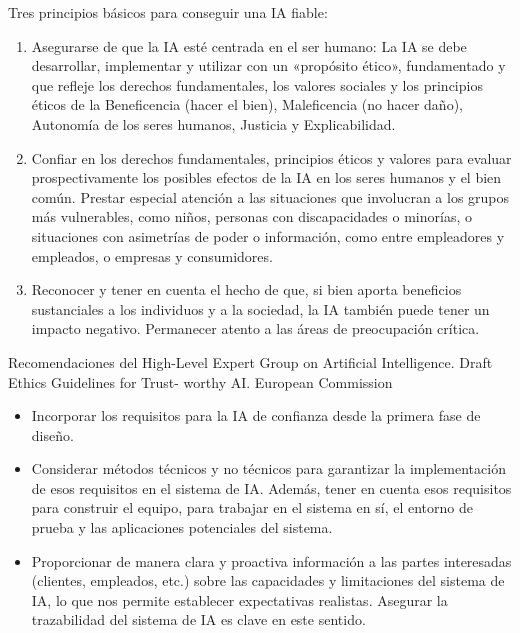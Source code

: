 \documentclass[final]{beamer}
\newlength{\colwidth}
\begin{document}
\begin{frame}[t]
\begin{columns}[t]
\begin{column}{\colwidth}
  \begin{block}{Tres principios básicos para conseguir una IA ﬁable:}
\begin{enumerate}
    \item Asegurarse de que la IA esté centrada en el ser humano: La IA se debe desarrollar, implementar y utilizar con un «propósito ético», fundamentado y que refleje los derechos fundamentales, los valores sociales y los principios éticos de la Beneficencia (hacer el bien), Maleficencia (no hacer daño), Autonomía de los seres humanos, Justicia y Explicabilidad.
    \item Confiar en los derechos fundamentales, principios éticos y valores para evaluar prospectivamente los posibles efectos de la IA en los seres humanos y el bien común. Prestar especial atención a las situaciones que involucran a los grupos más vulnerables, como niños, personas con discapacidades o minorías, o situaciones con asimetrías de poder o información, como entre empleadores y empleados, o empresas y consumidores.
    \item Reconocer y tener en cuenta el hecho de que, si bien aporta beneficios sustanciales a los individuos y a la sociedad, la IA también puede tener un impacto negativo. Permanecer atento a las áreas de preocupación crítica.\cite{avila-tomas_inteligencia_2021}
\end{enumerate}

  \end{block}

  \begin{exampleblock}{Recomendaciones del High-Level Expert Group on Artiﬁcial Intelligence. Draft Ethics Guidelines for Trust- worthy AI. European Commission\cite{avila-tomas_inteligencia_2021}}
\begin{itemize}
    \item Incorporar los requisitos para la IA de conﬁanza desde la    primera fase de diseño.
    \item Considerar métodos técnicos y no técnicos para garantizar la implementación de esos requisitos en el sistema de IA. Además, tener en cuenta esos requisitos para construir el equipo, para trabajar en el sistema en sí, el entorno de prueba y las aplicaciones potenciales del sistema.
    \item Proporcionar de manera clara y proactiva información a las partes interesadas (clientes, empleados, etc.) sobre     las capacidades y limitaciones del sistema de IA, lo que nos permite establecer expectativas realistas. Asegurar la trazabilidad del sistema de IA es clave en este sentido.
   

\end{itemize}
\end{exampleblock}
\end{column}
\end{columns}
\end{frame}
\end{document}
